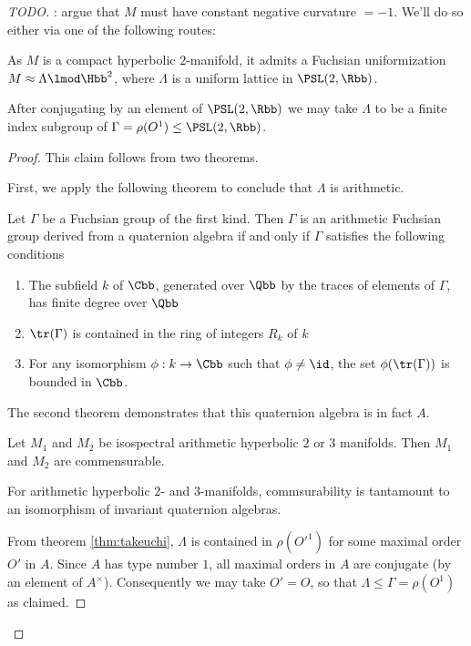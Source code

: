 \begin{proof}
  [TODO]: argue that $M$ must have constant negative curvature $=-1$. We'll do so either via one of the following routes:


  As $M$ is a compact hyperbolic $2$-manifold, it admits a Fuchsian uniformization $M \approx \Lambda \lmod \Hbb^2$, where $\Lambda$ is a uniform lattice in $\PSL(2,\Rbb)$.
  \begin{claim}
    After conjugating by an element of $\PSL(2,\Rbb)$ we may take $\Lambda$ to be a finite index subgroup of $\Gamma = \rho(O^1) \leq  \PSL(2,\Rbb)$.
  \end{claim}
  \begin{proof}
    This claim follows from two theorems.

    First, we apply the following theorem to conclude that $\Lambda$ is arithmetic.
    \begin{thm}\label{thm:takeuchi}
      Let $\Gamma$ be a Fuchsian group of the first kind. Then $\Gamma$ is an arithmetic Fuchsian group derived from a quaternion algebra if and only if $\Gamma$ satisfies the following conditions
      \begin{enumerate}
        \item The subfield $k$ of $\Cbb$, generated over $\Qbb$ by the traces of elements of $\Gamma$, has finite degree over $\Qbb$
        \item $\tr(\Gamma)$ is contained in the ring of integers $R_{k}$ of $k$
        \item For any isomorphism $\phi: k \to \Cbb$ such that $\phi \neq \id$, the set $\phi(\tr(\Gamma))$ is bounded in $\Cbb$.
      \end{enumerate}
    \end{thm}

    The second theorem demonstrates that this quaternion algebra is in fact $A$.
    \begin{thm}

      Let $M_1$ and $M_2$ be isospectral arithmetic hyperbolic $2$ or $3$ manifolds. Then $M_1$ and $M_2$ are commensurable.
    \end{thm}
    For arithmetic hyperbolic $2$- and $3$-manifolds, commsurability is tantamount to an isomorphism of invariant quaternion algebras.

    From theorem \ref{thm:takeuchi}, $\Lambda$ is contained in $\rho(O'^1)$ for some maximal order $O'$ in $A$. Since $A$ has type number $1$, all maximal orders in $A$ are conjugate (by an element of $A^\times$). Consequently we may take $O'=O$, so that $\Lambda \leq \Gamma = \rho(O^1)$ as claimed.



\end{proof}
\end{proof}
